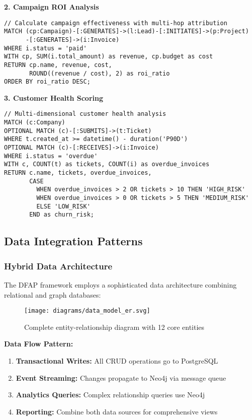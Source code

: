 \textbf{2. Campaign ROI Analysis}
\begin{verbatim}
// Calculate campaign effectiveness with multi-hop attribution
MATCH (cp:Campaign)-[:GENERATES]->(l:Lead)-[:INITIATES]->(p:Project)
      -[:GENERATES]->(i:Invoice)
WHERE i.status = 'paid'
WITH cp, SUM(i.total_amount) as revenue, cp.budget as cost
RETURN cp.name, revenue, cost, 
       ROUND((revenue / cost), 2) as roi_ratio
ORDER BY roi_ratio DESC;
\end{verbatim}

\textbf{3. Customer Health Scoring}
\begin{verbatim}
// Multi-dimensional customer health analysis
MATCH (c:Company)
OPTIONAL MATCH (c)-[:SUBMITS]->(t:Ticket)
WHERE t.created_at >= datetime() - duration('P90D')
OPTIONAL MATCH (c)-[:RECEIVES]->(i:Invoice)
WHERE i.status = 'overdue'
WITH c, COUNT(t) as tickets, COUNT(i) as overdue_invoices
RETURN c.name, tickets, overdue_invoices,
       CASE 
         WHEN overdue_invoices > 2 OR tickets > 10 THEN 'HIGH_RISK'
         WHEN overdue_invoices > 0 OR tickets > 5 THEN 'MEDIUM_RISK'
         ELSE 'LOW_RISK'
       END as churn_risk;
\end{verbatim}

\subsection{Data Integration Patterns}

\subsubsection{Hybrid Data Architecture}

The DFAP framework employs a sophisticated data architecture combining relational and graph databases:

\begin{figure}[h]
  \centering
  \texttt{[image: diagrams/data\_model\_er.svg]}
  \caption{Complete entity-relationship diagram with 12 core entities}
\end{figure}

\textbf{Data Flow Pattern:}
\begin{enumerate}
  \item \textbf{Transactional Writes:} All CRUD operations go to PostgreSQL
  \item \textbf{Event Streaming:} Changes propagate to Neo4j via message queue
  \item \textbf{Analytics Queries:} Complex relationship queries use Neo4j
  \item \textbf{Reporting:} Combine both data sources for comprehensive views
\end{enumerate}

